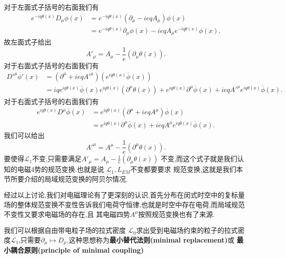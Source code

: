 \documentclass[../main.tex]{subfiles}
\begin{document}
 对于左面式子括号的右面我们有
 \begin{align*}
 e^{-iq\theta(x)}D_\mu\phi(x) & = e^{-iq\theta(x)} (\partial_\mu - ieqA_\mu)\phi(x)\\
                              & = e^{-iq\theta(x)} \partial_\mu \phi(x) - ieq A_\mu e^{-iq\theta(x)} \phi(x)
 .\end{align*}
 故左面式子给出\[
 A'_\mu = A_\mu - \frac{1}{e}(\partial_\mu \theta(x))
 .\] 
 对于右面式子括号的右面我们有
 \begin{align*}
 D'^\mu \overline{\phi'}(x) & =  (\partial^\mu + ieq A'^\mu)(e^{iq\theta(x)}\overline{\phi}(x))\\
                            & = iq e^{iq\theta(x)} \overline{\phi}(x) e^{iq\theta(x)}(\partial^\mu \theta(x)) + e^{iq\theta(x)} \partial^\mu \overline{\phi}(x) + ieqA'^\mu e^{iq\theta(x)} \overline{\phi}(x)
 .\end{align*}
 对于右面式子括号的右面我们有
 \begin{align*}
 e^{iq\theta(x)} D^\mu \overline{\phi}(x) & = e^{iq\theta(x)}(\partial^\mu + ieq A^\mu)\overline{\phi}(x)\\
                                          & = e^{iq\theta(x)} \partial^\mu \overline{\phi}(x) + ieqA^\mu e^{iq\theta(x)} \overline{\phi}(x)
 .\end{align*}
 我们可以给出\[
 A'^\mu = A^\mu - \frac{1}{e}(\partial^\mu \theta(x))
 .\] 
 要使得$\mathscr{L}_1$不变,只需要满足$A'_\mu = A_\mu - \frac{1}{e}(\partial_\mu \theta(x))$ 不变,而这个式子就是我们认知的电磁4势的规范变换.也就是说 $\mathscr{L}_1,L_{EM}$不变都要要求
 规范变换,这就是我们本节所要介绍的局域规范变换的阿贝尔情况.

 经过以上讨论,我们对电磁理论有了更深刻的认识,首先分布在闵式时空中的复标量场的整体规范变换不变性告诉我们电荷守恒律,也就是时空中存在电荷,而局域规范不变性又要求电磁场的存在,且
 其电磁四势$A^\mu$按照规范变换也有了来源.

 我们可以根据自由带电粒子场的拉式密度 $\mathscr{L}_0$求出受到电磁场约束的粒子的拉式密度$\mathscr{L}_1$,只需要$\partial_\mu \mapsto D_\mu$,这种思想称为\textbf{最小替代法则(minimal replacement)}或
 \textbf{最小耦合原则(principle of minimal coupling)}
\end{document}
